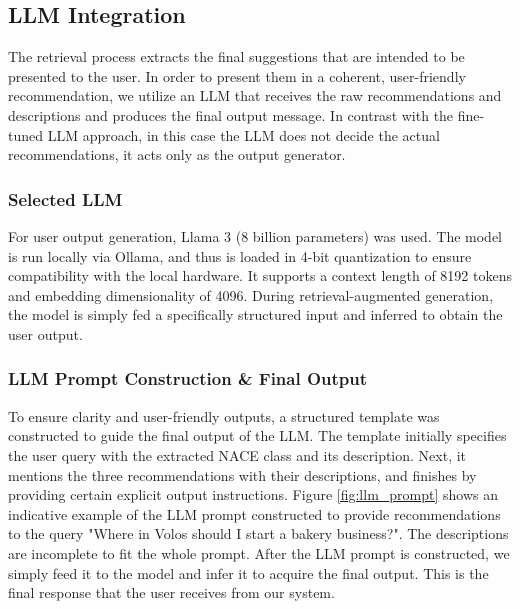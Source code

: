 \subsection{LLM Integration}

The retrieval process extracts the final suggestions that are intended to be presented to the user. In order to present them in a coherent, user-friendly recommendation, we utilize an LLM that receives the raw recommendations and descriptions and produces the final output message. In contrast with the fine-tuned LLM approach, in this case the LLM does not decide the actual recommendations, it acts only as the output generator.



\subsubsection{Selected LLM}

For user output generation, Llama 3 (8 billion parameters) was used. The model is run locally via Ollama, and thus is loaded in 4-bit quantization to ensure compatibility with the local hardware. It supports a context length of 8192 tokens and embedding dimensionality of 4096. During retrieval-augmented generation, the model is simply fed a specifically structured input and inferred to obtain the user output.


\subsubsection{LLM Prompt Construction \& Final Output}

To ensure clarity and user-friendly outputs, a structured template was constructed to guide the final output of the LLM. The template initially specifies the user query with the extracted NACE class and its description. Next, it mentions the three recommendations with their descriptions, and finishes by providing certain explicit output instructions. Figure \ref{fig:llm_prompt} shows an indicative example of the LLM prompt constructed to provide recommendations to the query "Where in Volos should I start a bakery business?". The descriptions are incomplete to fit the whole prompt. After the LLM prompt is constructed, we simply feed it to the model and infer it to acquire the final output. This is the final response that the user receives from our system.
 

